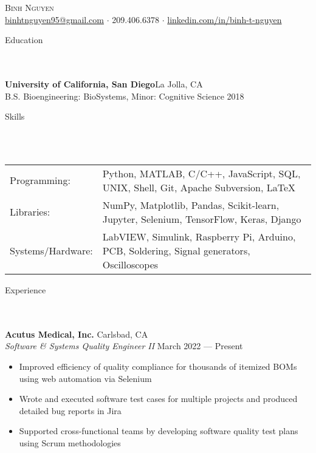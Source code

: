 \documentclass{article}
\newcommand{\lineunder} {
    \vspace*{-8pt} \\
    \hspace*{-18pt} \hrulefill \\
}
\newcommand{\header} [1] {
    {\hspace*{-18pt}\vspace*{6pt} \Large{#1} }
    \vspace*{-6pt} 
    \lineunder
}
\begin{document}

\vspace*{-40pt}


\begin{center}
	{\Huge \scshape {Binh Nguyen}}\\
	\vspace{2mm}
	\href{mailto:binhtnguyen95@gmail.com}{binhtnguyen95@gmail.com} $\cdot$ 
	209.406.6378 $\cdot$ 
	\href{https://www.linkedin.com/in/binh-t-nguyen}{linkedin.com/in/binh-t-nguyen} 
\end{center}

\header{Education}
\textbf{University of California, San Diego}\hfill La Jolla, CA\\
B.S. Bioengineering: BioSystems, Minor: Cognitive Science \hfill 2018\\
\vspace{7mm}

\header{Skills}
\vspace{1mm}
\begin{tabular}{ l l }
	Programming: & Python, MATLAB, C/C++, JavaScript, SQL, UNIX, Shell, Git, Apache Subversion, \LaTeX \\
	Libraries:   & NumPy, Matplotlib, Pandas, Scikit-learn, Jupyter, Selenium, TensorFlow, Keras, Django \\
	Systems/Hardware:    & LabVIEW, Simulink, Raspberry Pi, Arduino, PCB, Soldering, Signal generators, Oscilloscopes  \\
\end{tabular}
\vspace{5mm}

\header{Experience}

\textbf{Acutus Medical, Inc.} \hfill Carlsbad, CA\\
\textit{Software \& Systems Quality Engineer II} \hfill March 2022 --- Present\\
\vspace{-2mm}
\begin{itemize} \itemsep 0.05pt
	\item Improved efficiency of quality compliance for thousands of itemized BOMs using web automation via Selenium
	\item Wrote and executed software test cases for multiple projects and produced detailed bug reports in Jira
	\item Supported cross-functional teams by developing software quality test plans using Scrum methodologies
\end{itemize}
\end{document}

